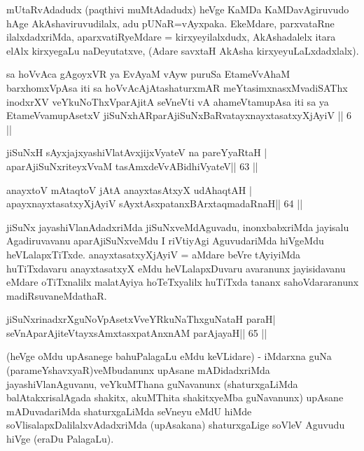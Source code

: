 \begin{artha}
mUtaRvAdadudx (paqthivi muMtAdadudx) heVge KaMDa KaMDavAgiruvudo hAge 
AkAshaviruvudilalx, adu pUNaR=vAyxpaka. EkeMdare, parxvataRne 
ilalxdadxriMda, aparxvatiRyeMdare = kirxyeyilalxdudx, AkAshadalelx 
itara elAlx kirxyegaLu naDeyutatxve, (Adare savxtaH AkAsha 
kirxyeyuLaLxdadxlalx).
\end{artha}


\begin{kandikeshl}
sa hoVvAca gAgoyxVR ya EvAyaM vAyw puruSa EtameVvAhaM barxhomxVpAsa iti sa hoVvAcAjAtashaturxmAR meYtasimxnasxMvadiSAThx inodxrXV veYkuNoThxV\s parAjitA seVneVti vA ahameVtamupAsa iti sa ya EtameVvamupAsetxV jiSuNxhARparAjiSuNxBaRvatayxnayxtasatxyXjAyiV || 6 ||
\end{kandikeshl}



\begin{shl}
jiSuNxH sAyxjajxyashiVlatAvxjijxVyateV na pareYyaRtaH |
aparAjiSuNxriteyxVvaM tasAmxdeVvABidhiVyateV\hfill || 63 ||
\end{shl}

\begin{shl}
anayxtoV mAtaqtoV jAtA anayxtasAtxyX udAhaqtAH |
apayxnayxtasatxyXjAyiV sAyxtAsxpatanxBArxtaqmadaRnaH\hfill || 64 ||
\end{shl}

\begin{artha}
jiSuNx jayashiVlanAdadxriMda jiSuNxveMdAguvadu, inonxbabxriMda jayisalu  Agadiruvavanu aparAjiSuNxveMdu I riVtiyAgi AguvudariMda hiVgeMdu heVLalapxTiTxde. anayxtasatxyXjAyiV = aMdare beVre tAyiyiMda huTiTxdavaru anayxtasatxyX eMdu heVLalapxDuvaru avaranunx jayisidavanu eMdare oTiTxnalilx malatAyiya hoTeTxyalilx huTiTxda tananx sahoVdararanunx madiRsuvaneMdathaR.
\end{artha}

\begin{shl}
jiSuNxrinadxrXguNoVpAsetxVveYRkuNaThxguNataH paraH|
seVnA\s parAjiteVtayxsAmxtasxpatAnxnAM parAjayaH\hfill || 65 ||
\end{shl}

\begin{artha}
(heVge oMdu upAsanege bahuPalagaLu eMdu keVLidare) - iMdarxna guNa (parameYshavxyaR)veMbudanunx upAsane mADidadxriMda jayashiVlanAguvanu, veYkuMThana guNavanunx (shaturxgaLiMda balAtakxrisalAgada shakitx, akuMThita shakitxyeMba guNavanunx) upAsane mADuvadariMda shaturxgaLiMda seVneyu eMdU hiMde soVlisalapxDalilalxvAdadxriMda (upAsakana) shaturxgaLige soVleV Aguvudu hiVge (eraDu PalagaLu).
\end{artha}

